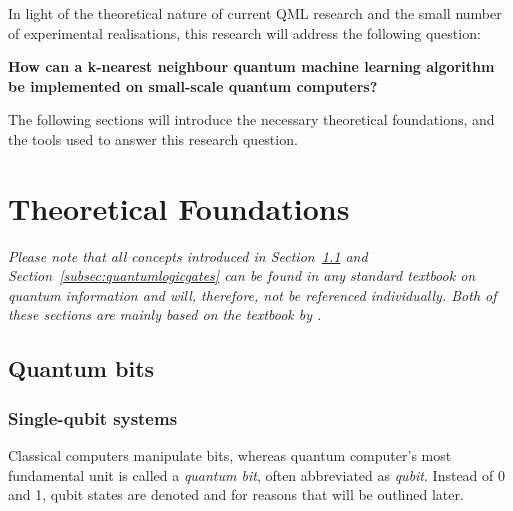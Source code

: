 


In light of the theoretical nature of current QML research and the small number of experimental realisations, this research will address the following question:

\centering\textbf{How can a k-nearest neighbour quantum machine learning algorithm be implemented on small-scale quantum computers?}


\justify
The following sections will introduce the necessary theoretical foundations, and the tools used to answer this research question. 

\chapter{Theoretical Foundations}\label{sec:theory}
\emph{Please note that all concepts introduced in Section~\ref{subsec:qubits} and Section~\ref{subsec:quantumlogicgates} can be found in any standard textbook on quantum information and will, therefore, not be referenced individually. Both of these sections are mainly based on the textbook by .}
\section{Quantum bits}
\label{subsec:qubits}
\subsection{Single-qubit systems}
\label{subsubsec:qubits}
Classical computers manipulate bits, whereas quantum computer's most fundamental unit is called a \emph{quantum bit}, often abbreviated as \emph{qubit}. Instead of 0 and 1, qubit states are denoted \0 and \1 for reasons that will be outlined later.

